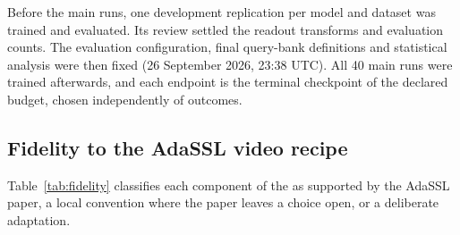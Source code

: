 Before the main runs, one development replication per model and dataset was trained and evaluated. Its review settled the readout transforms and evaluation counts. The evaluation configuration, final query-bank definitions and statistical analysis were then fixed (26 September 2026, 23:38 UTC). All 40 main runs were trained afterwards, and each endpoint is the terminal checkpoint of the declared budget, chosen independently of outcomes.

\subsection{Fidelity to the AdaSSL video recipe}
\label{app:fidelity}

Table~\ref{tab:fidelity} classifies each component of the \emavar{} as supported by the AdaSSL paper, a local convention where the paper leaves a choice open, or a deliberate adaptation.

